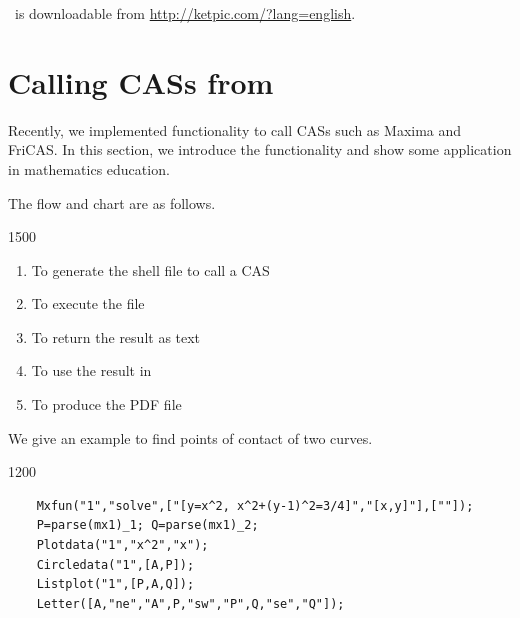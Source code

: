 \documentclass[11pt]{article}
\begin{document}
\vspace{42mm}

\newpage



\ketcindy\ is downloadable from \url{http://ketpic.com/?lang=english}.

\section{Calling CASs from \ketcindy}

Recently, we implemented functionality to call CASs such as Maxima and FriCAS.
In this section, we introduce the functionality and show some application in mathematics education.

The flow and chart are as follows.\vspace{-1mm}

\begin{layer}{150}{0}
\addtocounter{figno}{1}
\end{layer}

\begin{enumerate}
\item To generate the shell file to call a CAS\vspace{-2mm}
\item To execute the file\vspace{-2mm}
\item To return the result as text\vspace{-2mm}
\item To use the result in \ketcindy\vspace{-2mm}
\item To produce the PDF file\vspace{-2mm}
\end{enumerate}

\vspace{3mm}

We give an example to find points of contact of two curves.\vspace{-2mm}

\begin{layer}{120}{0}
\addtocounter{figno}{1}%
\end{layer}

{\small
\begin{verbatim}
    Mxfun("1","solve",["[y=x^2, x^2+(y-1)^2=3/4]","[x,y]"],[""]);
    P=parse(mx1)_1; Q=parse(mx1)_2;
    Plotdata("1","x^2","x");
    Circledata("1",[A,P]);
    Listplot("1",[P,A,Q]);
    Letter([A,"ne","A",P,"sw","P",Q,"se","Q"]);
\end{verbatim}
}
\end{document}
